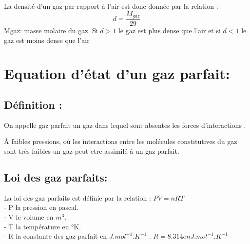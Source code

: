 \documentclass[12pt]{article}
\begin{document}
La densité d'un gaz par rapport à l'air est donc donnée par la relation : $$d = \frac{M_{gaz}}{29} $$
Mgaz: masse molaire du gaz.
Si $d>1$ le gaz est plus dense que l'air et si
$d<1$ le gaz est moins dense que l'air
\section{Equation d'état d'un gaz parfait:}
\subsection{Définition :}
On appelle gaz parfait un gaz dans lequel sont absentes les forces d'interactions .

À faibles pressions, où les interactions entre les molécules constitutives du gaz sont très faibles un gaz peut etre
assimilé à un gaz parfait.
\subsection{Loi des gaz parfaits: }
La loi des gaz parfaits est définie par la relation : $PV = nRT$
\\- P la pression en pascal.
\\- V le volume en $m^3$.
\\- T la température en °K.
\\- R la constante des gaz parfait en $J.mol^{-1}.K^{-1}$ . $R=8.314 en J.mol^{-1}.K^{-1}$
\end{document}
